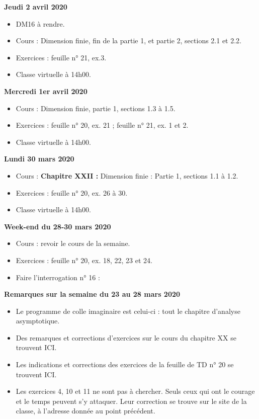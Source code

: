 \documentclass[12pt,a4paper]{article}
\begin{document}
\noindent\textbf{Jeudi 2 avril 2020}
\begin{itemize}
\item DM16 à rendre.
\item Cours : Dimension finie, fin de la partie 1, et partie 2, sections 2.1 et 2.2.
\item Exercices : feuille n° 21, ex.3.
\item Classe virtuelle à 14h00.\vspace{.4cm}
\end{itemize}

\noindent\textbf{Mercredi 1er avril 2020}
\begin{itemize}
\item Cours : Dimension finie, partie 1, sections 1.3 à 1.5.
\item Exercices : feuille n° 20, ex. 21 ; feuille n° 21, ex. 1 et 2.
\item Classe virtuelle à 14h00.\vspace{.4cm}
\end{itemize}

\noindent\textbf{\bf Lundi 30 mars 2020}
\begin{itemize}
\item Cours : \textbf{Chapitre XXII :} Dimension finie : Partie 1, sections 1.1 à 1.2.
\item Exercices : feuille n° 20, ex. 26 à 30.
\item Classe virtuelle à 14h00.\vspace{.4cm}
\end{itemize}

\noindent\textbf{Week-end du 28-30 mars 2020}
\begin{itemize}
\item Cours : revoir le cours de la semaine.
\item Exercices : feuille n° 20, ex. 18, 22, 23 et 24.
\item Faire l'\og interrogation \fg n° 16 : 
\vspace{.4cm}
\end{itemize}

\noindent\textbf{\bf Remarques sur la semaine du 23 au 28 mars 2020}
\begin{itemize}
\item Le programme de colle imaginaire est celui-ci : tout le chapitre d'analyse asymptotique.
\item Des remarques et corrections d'exercices sur le cours du chapitre XX se trouvent ICI.
\item Les indications et corrections des exercices de la feuille de TD n° 20 se trouvent ICI.
\item Les exercices 4, 10 et 11 ne sont pas à chercher. Seuls ceux qui ont le courage et le temps peuvent s'y attaquer. Leur correction se trouve sur le site de la classe, à l'adresse donnée au point précédent.\vspace{.4cm}
\end{itemize}
\end{document}
